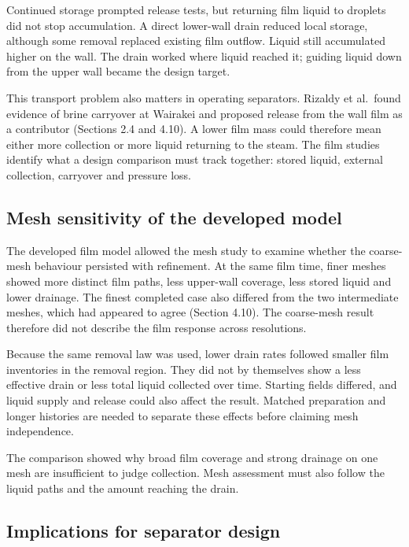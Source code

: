 \documentclass[12pt]{article}
\begin{document}
Continued storage prompted release tests, but returning film liquid to droplets did not stop accumulation. A direct lower-wall drain reduced local storage, although some removal replaced existing film outflow. Liquid still accumulated higher on the wall. The drain worked where liquid reached it; guiding liquid down from the upper wall became the design target.

This transport problem also matters in operating separators. Rizaldy et al.~found evidence of brine carryover at Wairakei and proposed release from the wall film as a contributor (Sections 2.4 and 4.10). A lower film mass could therefore mean either more collection or more liquid returning to the steam. The film studies identify what a design comparison must track together: stored liquid, external collection, carryover and pressure loss.

\subsection{Mesh sensitivity of the developed model}\label{mesh-sensitivity-of-the-developed-model}

The developed film model allowed the mesh study to examine whether the coarse-mesh behaviour persisted with refinement. At the same film time, finer meshes showed more distinct film paths, less upper-wall coverage, less stored liquid and lower drainage. The finest completed case also differed from the two intermediate meshes, which had appeared to agree (Section 4.10). The coarse-mesh result therefore did not describe the film response across resolutions.

Because the same removal law was used, lower drain rates followed smaller film inventories in the removal region. They did not by themselves show a less effective drain or less total liquid collected over time. Starting fields differed, and liquid supply and release could also affect the result. Matched preparation and longer histories are needed to separate these effects before claiming mesh independence.

The comparison showed why broad film coverage and strong drainage on one mesh are insufficient to judge collection. Mesh assessment must also follow the liquid paths and the amount reaching the drain.

\subsection{Implications for separator design}\label{implications-for-separator-design}
\end{document}
